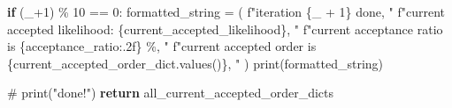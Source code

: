 \documentclass[
  letterpaper,
  DIV=11,
  numbers=noendperiod]{scrreprt}
\newenvironment{Shaded}{\begin{snugshade}}{\end{snugshade}}
\newcommand{\BuiltInTok}[1]{\textcolor[rgb]{0.00,0.23,0.31}{#1}}
\newcommand{\CommentTok}[1]{\textcolor[rgb]{0.37,0.37,0.37}{#1}}
\newcommand{\ControlFlowTok}[1]{\textcolor[rgb]{0.00,0.23,0.31}{\textbf{#1}}}
\newcommand{\DecValTok}[1]{\textcolor[rgb]{0.68,0.00,0.00}{#1}}
\newcommand{\NormalTok}[1]{\textcolor[rgb]{0.00,0.23,0.31}{#1}}
\newcommand{\OperatorTok}[1]{\textcolor[rgb]{0.37,0.37,0.37}{#1}}
\newcommand{\SpecialCharTok}[1]{\textcolor[rgb]{0.37,0.37,0.37}{#1}}
\newcommand{\SpecialStringTok}[1]{\textcolor[rgb]{0.13,0.47,0.30}{#1}}
\begin{document}
\begin{Shaded}
\begin{Highlighting}[]
        \ControlFlowTok{if}\NormalTok{ (\_}\OperatorTok{+}\DecValTok{1}\NormalTok{) }\OperatorTok{\%} \DecValTok{10} \OperatorTok{==} \DecValTok{0}\NormalTok{:}
\NormalTok{            formatted\_string }\OperatorTok{=}\NormalTok{ (}
                \SpecialStringTok{f"iteration }\SpecialCharTok{\{}\NormalTok{\_ }\OperatorTok{+} \DecValTok{1}\SpecialCharTok{\}}\SpecialStringTok{ done, "}
                \SpecialStringTok{f"current accepted likelihood: }\SpecialCharTok{\{}\NormalTok{current\_accepted\_likelihood}\SpecialCharTok{\}}\SpecialStringTok{, "}
                \SpecialStringTok{f"current acceptance ratio is }\SpecialCharTok{\{}\NormalTok{acceptance\_ratio}\SpecialCharTok{:.2f\}}\SpecialStringTok{ \%, "}
                \SpecialStringTok{f"current accepted order is }\SpecialCharTok{\{}\NormalTok{current\_accepted\_order\_dict}\SpecialCharTok{.}\NormalTok{values()}\SpecialCharTok{\}}\SpecialStringTok{, "}
\NormalTok{            )}
            \BuiltInTok{print}\NormalTok{(formatted\_string)}

    \CommentTok{\# print("done!")}
    \ControlFlowTok{return}\NormalTok{ all\_current\_accepted\_order\_dicts}
\end{Highlighting}
\end{Shaded}
\end{document}
